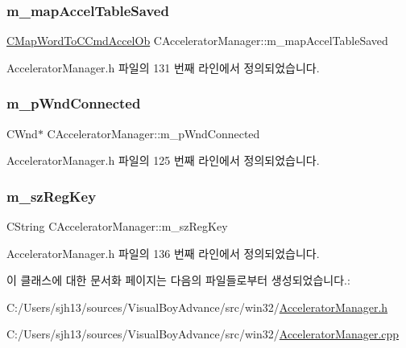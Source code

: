 \subsubsection{\texorpdfstring{m\+\_\+map\+Accel\+Table\+Saved}{m\_mapAccelTableSaved}}
{\footnotesize\ttfamily \mbox{\hyperlink{_accelerator_manager_8h_a8089a146b94f6314b9c45d955d18d052}{C\+Map\+Word\+To\+C\+Cmd\+Accel\+Ob}} C\+Accelerator\+Manager\+::m\+\_\+map\+Accel\+Table\+Saved\hspace{0.3cm}{\ttfamily [protected]}}



Accelerator\+Manager.\+h 파일의 131 번째 라인에서 정의되었습니다.

\mbox{\label{class_c_accelerator_manager_a24f706c75f754982051e1d7fad1916da}} 
\subsubsection{\texorpdfstring{m\+\_\+p\+Wnd\+Connected}{m\_pWndConnected}}
{\footnotesize\ttfamily C\+Wnd$\ast$ C\+Accelerator\+Manager\+::m\+\_\+p\+Wnd\+Connected\hspace{0.3cm}{\ttfamily [protected]}}



Accelerator\+Manager.\+h 파일의 125 번째 라인에서 정의되었습니다.

\mbox{\label{class_c_accelerator_manager_a03a6d0e43bcfb63cf1a23ad12cb5aa35}} 
\subsubsection{\texorpdfstring{m\+\_\+sz\+Reg\+Key}{m\_szRegKey}}
{\footnotesize\ttfamily C\+String C\+Accelerator\+Manager\+::m\+\_\+sz\+Reg\+Key\hspace{0.3cm}{\ttfamily [protected]}}



Accelerator\+Manager.\+h 파일의 136 번째 라인에서 정의되었습니다.



이 클래스에 대한 문서화 페이지는 다음의 파일들로부터 생성되었습니다.\+:\begin{DoxyCompactItemize}
\item 
C\+:/\+Users/sjh13/sources/\+Visual\+Boy\+Advance/src/win32/\mbox{\hyperlink{_accelerator_manager_8h}{Accelerator\+Manager.\+h}}\item 
C\+:/\+Users/sjh13/sources/\+Visual\+Boy\+Advance/src/win32/\mbox{\hyperlink{_accelerator_manager_8cpp}{Accelerator\+Manager.\+cpp}}\end{DoxyCompactItemize}
